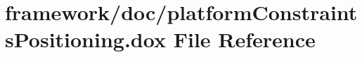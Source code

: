 \hypertarget{platform_constraints_positioning_8dox}{}\section{framework/doc/platform\+Constraints\+Positioning.dox File Reference}
\label{platform_constraints_positioning_8dox}
